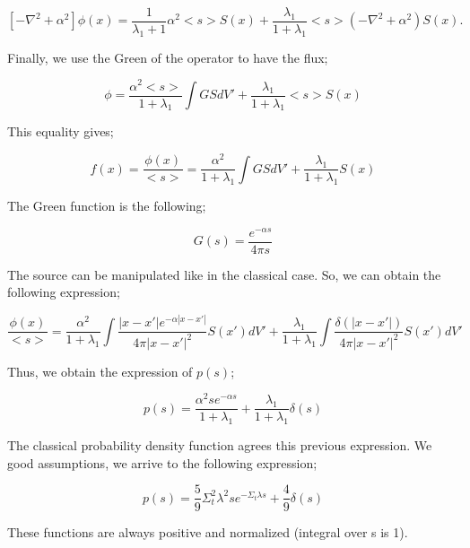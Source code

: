 \documentclass[a4paper, 12pt]{report}
\newcommand{\bl}{\big<}
\newcommand{\bg}{\big>}
\begin{document}
\begin{equation}
\left[- \nabla^2 + \alpha^2\right]\phi(x) = \frac{1}{\lambda_1 +1}\alpha^2 \bl s \bg S(x) + \frac{\lambda_1}{1+\lambda_1} \bl s \bg \left(-\nabla^2 + \alpha^2 \right) S(x).
\end{equation}

Finally, we use the Green of the operator to have the flux;

\begin{equation}
\phi = \frac{\alpha^2 \bl s \bg }{1+\lambda_1}\int GS dV' + \frac{\lambda_1}{1+\lambda_1} \bl s \bg S(x)
\end{equation}

This equality gives;

\begin{equation}
f(x) = \frac{\phi(x)}{\bl s \bg} = \frac{\alpha^2 }{1+\lambda_1}\int GS dV' + \frac{\lambda_1}{1+\lambda_1}S(x)
\end{equation}

The Green function is the following;

\begin{equation}
G(s) = \frac{e^{-\alpha s}}{4 \pi s}
\end{equation}

The source can be manipulated like in the classical case. So, we can obtain the following expression;

\begin{equation}
\frac{\phi(x)}{\bl s \bg} = \frac{\alpha^2}{1+\lambda_1} \int \frac{|x-x'|e^{-\alpha|x-x'|}}{4\pi |x-x'|^2}S(x')dV' + \frac{\lambda_1}{1+\lambda_1} \int \frac{\delta(|x-x'|)}{4\pi |x-x'|^2}S(x')dV' 
\end{equation}

Thus, we obtain the expression of $p(s)$;

\begin{equation}
p(s) = \frac{\alpha^2 se^{-\alpha s}}{1+\lambda_1} + \frac{\lambda_1}{1+\lambda_1}\delta(s)
\end{equation}

The classical probability density function agrees this previous expression. We good assumptions, we arrive to the following expression;

\begin{equation}
p(s) =\frac{5}{9} \Sigma_t^2 \lambda^2 s e^{-\Sigma_t \lambda s} + \frac{4}{9} \delta(s)
\end{equation}

These functions are always positive and normalized (integral over s is 1).
\end{document}
